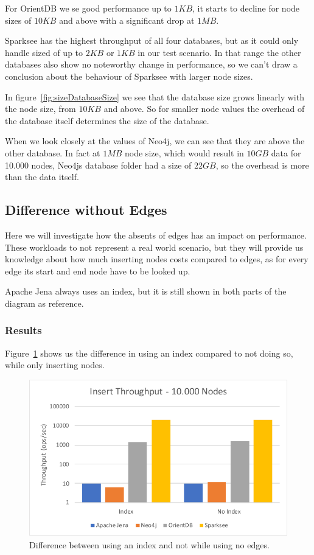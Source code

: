 For OrientDB we se good performance up to $ 1KB $,
it starts to decline for node sizes of $ 10KB $ and above with a significant drop at $ 1MB $.

Sparksee has the highest throughput of all four databases,
but as it could only handle sized of up to $ 2KB $ or $ 1KB $ in our test scenario.
In that range the other databases also show no noteworthy change in performance,
so we can't draw a conclusion about the behaviour of Sparksee with larger node sizes.

In figure~\ref{fig:sizeDatabaseSize} we see that the database size grows linearly with the node size,
from $ 10KB $ and above.
So for smaller node values the overhead of the database itself determines the size of the database.

When we look closely at the values of Neo4j,
we can see that they are above the other database.
In fact at $ 1MB $ node size,
which would result in $ 10GB $ data for 10.000 nodes,
Neo4js database folder had a size of $ 22GB $,
so the overhead is more than the data itself.

\subsection{Difference without Edges}
\label{ch:evaluation:se:differenceEdges}
Here we will investigate how the absents of edges has an impact on performance.
These workloads to not represent a real world scenario,
but they will provide us knowledge about how much inserting nodes costs compared to edges,
as for every edge its start and end node have to be looked up.

Apache Jena always uses an index,
but it is still shown in both parts of the diagram as reference.

\subsubsection{Results}
Figure~\ref{fig:noEdges} shows us the difference in using an index compared to not doing so,
while only inserting nodes.

\begin{figure}[h!]
  \centering
  \includegraphics[width=.5\textwidth]{images/throughput/noEdges}
  \caption{Difference between using an index and not while using no edges.}
  \label{fig:noEdges}
\end{figure}


